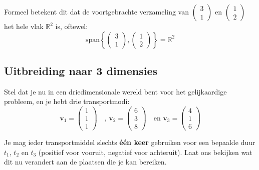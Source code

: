 \documentclass{ximera}
\begin{document}
\begin{exercise}
\begin{oplossing}
Formeel betekent dit dat de voortgebrachte verzameling van \(\begin{pmatrix} 3 \\ 1 \end{pmatrix}\) en \(\begin{pmatrix} 1 \\ 2 \end{pmatrix}\) het hele vlak \(\mathbb{R}^2\) is, oftewel:
    \[
    \text{span}\left\{\begin{pmatrix} 3 \\ 1 \end{pmatrix}, \begin{pmatrix} 1 \\ 2 \end{pmatrix}\right\} = \mathbb{R}^2
    \]
\end{oplossing}
\end{exercise}

\subsection*{Uitbreiding naar 3 dimensies}
Stel dat je nu in een driedimensionale wereld bent voor het gelijkaardige probleem, en je hebt drie transportmodi:
\[\mathbf{v}_1 = \begin{pmatrix} 1 \\ 1 \\ 1 \end{pmatrix}\quad \text{, }\mathbf{v}_2 = \begin{pmatrix} 6 \\ 3 \\ 8 \end{pmatrix}\quad \text{en }\mathbf{v}_3 = \begin{pmatrix} 4 \\ 1 \\ 6 \end{pmatrix}\]

Je mag ieder transportmiddel slechts \textbf{één keer} gebruiken voor een bepaalde duur \(t_1\), \(t_2\) en \(t_3\) (positief voor vooruit, negatief voor achteruit).
Laat ons bekijken wat dit nu verandert aan de plaatsen die je kan bereiken.
\end{document}

